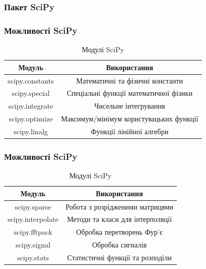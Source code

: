 \subsubsection{Пакет SciPy}
\begin{frame}
\frametitle{Можливості SciPy}
\begin{table}
  \caption{Модулі SciPy}
  \label{tab:}

  \begin{center}
    \begin{tabular}{|c|c|}
    \hline
      \textbf{Модуль} & \textbf{Використання} \\
      \hline
      scipy.constants & Математичні та фізичні константи\\
      \hline
      scipy.special & Спеціальні функції математичної фізики\\
      \hline
      scipy.integrate & Чисельне інтегрування\\
      \hline
      scipy.optimize & Максимум/мінімум користувацьких функції\\
      \hline
      scipy.linalg & Функції лінійної алгебри\\
      \hline
    \end{tabular}
  \end{center}
\end{table}
\end{frame}

\begin{frame}
\frametitle{Можливості SciPy}
\begin{table}
  \caption{Модулі SciPy}
  \label{tab:}

  \begin{center}
    \begin{tabular}{|c|c|}
    \hline
      \textbf{Модуль} & \textbf{Використання} \\
      \hline
      scipy.sparse & Робота з розрідженими матрицями\\
      \hline
      scipy.interpolate & Методи та класи для інтерполяції\\
      \hline
      scipy.fftpack & Обробка перетворень Фур'є\\
      \hline
      scipy.signal & Обробка сигналів\\
      \hline
      scipy.stats & Статистичні функції та розподіли\\
      \hline
    \end{tabular}
  \end{center}
\end{table}
\end{frame}

